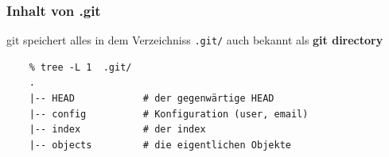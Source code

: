 \documentclass{beamer}
\begin{document}



\begin{frame}[fragile]
\frametitle{Inhalt von .git}

git speichert alles in dem Verzeichniss {\tt.git/} auch bekannt als \textbf{git
directory}

\begin{verbatim}
    % tree -L 1  .git/
    .
    |-- HEAD            # der gegenwärtige HEAD
    |-- config          # Konfiguration (user, email)
    |-- index           # der index
    |-- objects         # die eigentlichen Objekte

\end{verbatim}

\end{frame}
\end{document}
